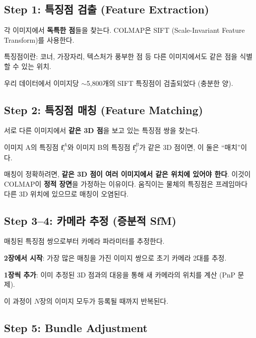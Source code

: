 \documentclass[11pt, a4paper]{report}
\theoremstyle{definition}
\theoremstyle{remark}
\begin{document}
\subsection{Step 1: 특징점 검출 (Feature Extraction)}

각 이미지에서 \textbf{독특한 점}들을 찾는다. COLMAP은 SIFT (Scale-Invariant Feature Transform)를 사용한다.

특징점이란: 코너, 가장자리, 텍스처가 풍부한 점 등 다른 이미지에서도 같은 점을 식별할 수 있는 위치.

\begin{practicebox}
우리 데이터에서 이미지당 $\sim$5,800개의 SIFT 특징점이 검출되었다 (충분한 양).
\end{practicebox}


\subsection{Step 2: 특징점 매칭 (Feature Matching)}

서로 다른 이미지에서 \textbf{같은 3D 점}을 보고 있는 특징점 쌍을 찾는다.

이미지 A의 특징점 $\mathbf{f}_i^A$와 이미지 B의 특징점 $\mathbf{f}_j^B$가 같은 3D 점이면,
이 둘은 ``매치''이다.

\begin{importantnote}
매칭이 정확하려면, \textbf{같은 3D 점이 여러 이미지에서 같은 위치에 있어야 한다}.
이것이 COLMAP이 \textbf{정적 장면}을 가정하는 이유이다.
움직이는 물체의 특징점은 프레임마다 다른 3D 위치에 있으므로 매칭이 오염된다.
\end{importantnote}


\subsection{Step 3--4: 카메라 추정 (증분적 SfM)}

매칭된 특징점 쌍으로부터 카메라 파라미터를 추정한다.

\textbf{2장에서 시작}: 가장 많은 매칭을 가진 이미지 쌍으로 초기 카메라 2대를 추정.

\textbf{1장씩 추가}: 이미 추정된 3D 점과의 대응을 통해 새 카메라의 위치를 계산 (PnP 문제).

이 과정이 $N$장의 이미지 모두가 등록될 때까지 반복된다.


\subsection{Step 5: Bundle Adjustment}
\end{document}
